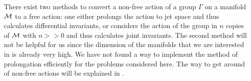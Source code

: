 There exist two methods to convert a non-free action of a group $\Gamma$ on a 
manifold $\mathcal{M}$ to a free action: one either prolongs the action to jet space and thus calculates
differential invariants, or considers the action of the group in $n$ copies of $\mathcal{M}$ with $n>>0$
and thus calculates joint invariants. The second method will not be helpful for us since the dimension
of the manifolds that we are interested in is already very high. We have not found a way to implement
the method of prolongation efficiently for the problems considered here. The way to get around of 
non-free actions will be explained in .

